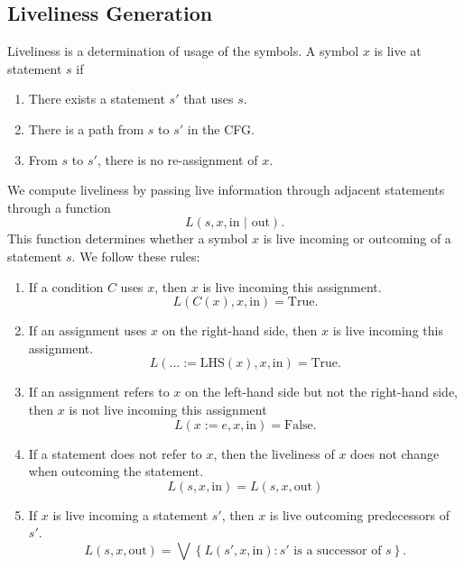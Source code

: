 \subsection{Liveliness Generation}
Liveliness is a determination of usage of the symbols. A symbol $x$ is live at statement $s$ if
\begin{enumerate}
  \item There exists a statement $s'$ that uses $s$.
  \item There is a path from $s$ to $s'$ in the CFG.
  \item From $s$ to $s'$, there is no re-assignment of $x$.
\end{enumerate}
We compute liveliness by passing live information through adjacent statements through a function
$$L(s,x, \text{in | out}).$$
This function determines whether a symbol $x$ is live incoming or outcoming of a statement $s$. We follow these rules:
\begin{enumerate}
  \item If a condition $C$ uses $x$, then $x$ is live incoming this assignment.
        \begin{equation}
          L(C(x), x, \mathrm{in}) = \mathrm{True}.
        \end{equation}
  \item If an assignment uses $x$ on the right-hand side, then $x$ is live incoming this assignment.
        \begin{equation}
          L(\ldots := \mathrm{LHS}(x), x, \mathrm{in}) = \mathrm{True}.
        \end{equation}
  \item If an assignment refers to $x$ on the left-hand side but not the right-hand side, then $x$ is not live incoming this assignment
        \begin{equation}
          L(x := e, x, \mathrm{in}) = \mathrm{False}.
        \end{equation}
  \item If a statement does not refer to $x$, then the liveliness of $x$ does not change when outcoming the statement.
        \begin{equation}
          L(s, x, \mathrm{in}) = L(s, x, \mathrm{out})
        \end{equation}
  \item If $x$ is live incoming a statement $s'$, then $x$ is live outcoming predecessors of $s'$.
        \begin{equation}
          L(s, x, \mathrm{out}) = \bigvee \left\{ L(s',x,\mathrm{in}) : s' \text{ is a successor of }  s\right\}.
        \end{equation}
\end{enumerate}

